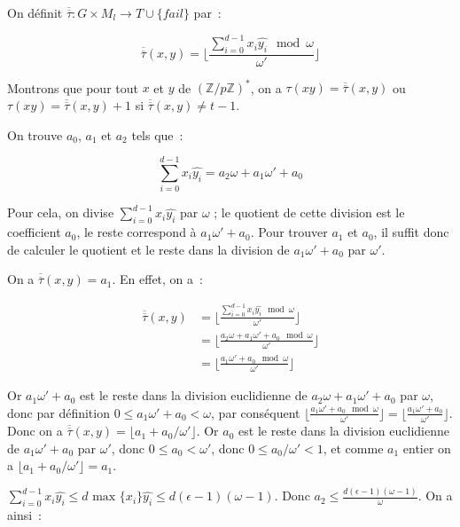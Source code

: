 		On définit $\overline{\overline{\tau}} : G \times M_l \longrightarrow T \cup \{fail\}$ par~:
		
		$$\overline{\overline{\tau}}(x,y) = \lfloor \frac{\sum_{i=0}^{d-1} x_i \hat{y_i}\mod \omega}{\omega'} \rfloor$$
		
		Montrons que pour tout $x$ et $y$ de $(\mathbb{Z}/p\mathbb{Z})^*$, on a $\tau(xy) = \overline{\overline{\tau}}(x,y)$ ou $\tau(xy) = \overline{\overline{\tau}}(x,y) + 1$ si $\overline{\overline{\tau}}(x,y) \neq t - 1$.
		
		On trouve $a_0$, $a_1$ et $a_2$ tels que~:
		
		$$ \sum_{i=0}^{d-1} x_i \hat{y_i} = a_2\omega + a_1\omega' + a_0 $$
		
		Pour cela, on divise $\sum_{i=0}^{d-1} x_i \hat{y_i}$ par $\omega$ ; le quotient de cette division est le coefficient $a_0$, le reste correspond à $a_1\omega' + a_0$. Pour trouver $a_1$ et $a_0$, il suffit donc de calculer le quotient et le reste dans la division de $a_1\omega' + a_0$ par $\omega'$.
		
		On a $\overline{\overline{\tau}}(x,y) = a_1$. En effet, on a~:
		
		\begin{align*}
		\overline{\overline{\tau}}(x,y) &= \lfloor \frac{\sum_{i=0}^{d-1} x_i \hat{y_i}\mod \omega}{\omega'} \rfloor \\
		                                &= \lfloor \frac{a_2\omega + a_1\omega' + a_0\mod \omega}{\omega'} \rfloor \\
		                                &= \lfloor \frac{a_1\omega' + a_0\mod \omega}{\omega'} \rfloor
		\end{align*}
		
		Or $a_1\omega' + a_0$ est le reste dans la division euclidienne de $a_2\omega + a_1\omega' + a_0$ par $\omega$, donc par définition $0 \leq a_1\omega' + a_0 <  \omega$, par conséquent $\lfloor \frac{a_1\omega' + a_0\mod \omega}{\omega'} \rfloor = \lfloor \frac{a_1\omega' + a_0}{\omega'} \rfloor$. Donc on a $\overline{\overline{\tau}}(x,y) = \lfloor a_1 + a_0/\omega' \rfloor$. Or $a_0$ est le reste dans la division euclidienne de $a_1\omega' + a_0$ par $\omega'$, donc $0 \leq a_0 < \omega'$, donc $0 \leq a_0/\omega' < 1$, et comme $a_1$ entier on a $\lfloor a_1 + a_0/\omega' \rfloor = a_1$.
		
		$\sum_{i=0}^{d-1} x_i \hat{y_i} \leq d \text{\ max }\{x_i\} \hat{y_i} \leq d(\epsilon - 1)(\omega - 1)$. Donc $a_2 \leq \frac{d(\epsilon - 1)(\omega - 1)}{\omega}$. On a ainsi~:
		
